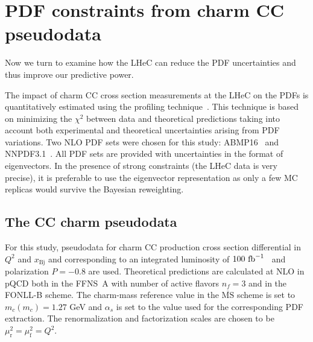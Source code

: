 \documentclass[pdftex,twocolumn,epjc3]{svjour3}          %
\newcommand{\abmp} {ABMP16\xspace}
\newcommand{\nnpdf} {NNPDF3.1\xspace}
\newcommand{\chisq}{\ensuremath{\chi^2}\xspace}
\newcommand{\xbj}{\ensuremath{x_{\text{Bj}}}\xspace}
\newcommand{\fonll} {{FONLL-B}\xspace}
\newcommand{\ffns} {{FFNS~A}\xspace}
\begin{document}
%
\section{PDF constraints from charm CC pseudodata}
\label{sec:PDF}

Now we turn to examine how the LHeC can reduce the PDF uncertainties
and thus improve our predictive power.

The impact of charm CC cross section measurements at the LHeC on the
PDFs is quantitatively estimated using the profiling
technique~\cite{Paukkunen:2014zia}. This technique is based on
minimizing the \chisq between data and theoretical predictions taking
into account both experimental and theoretical uncertainties arising
from PDF variations.
%
Two NLO PDF sets were chosen for this study:
\abmp~\cite{Alekhin:2018pai} and \nnpdf~\cite{Ball:2017nwa}. All PDF sets are provided with
uncertainties in the format of eigenvectors.
%
In the presence of strong constraints (the LHeC data is very precise),
it is preferable to use the eigenvector representation as only a few MC
replicas would survive the Bayesian reweighting.


%
\subsection{The CC  charm pseudodata}
\label{sec:pseudodata}

For this study, pseudodata for charm CC production cross section
differential in $Q^2$ and \xbj and corresponding to an integrated
luminosity of $100{\rm~fb}^{-1}$~\cite{AbelleiraFernandez:2012cc,Blumlein:1992we} and
polarization $P=-0.8$ are used.
%
%
%
Theoretical predictions are calculated at NLO
in pQCD both in the \ffns with number of active flavors $n_f = 3$ and
in the \fonll scheme. The charm-mass reference value in the
$\overline{\mbox{MS}}$ scheme is set to $m_c(m_c) = 1.27$ GeV and
$\alpha_s$ is set to the value used for the corresponding PDF
extraction. The renormalization and factorization scales are chosen to
be $\mu_\mathrm{r}^2 = \mu_\mathrm{f}^2 = Q^2$.
\end{document}
